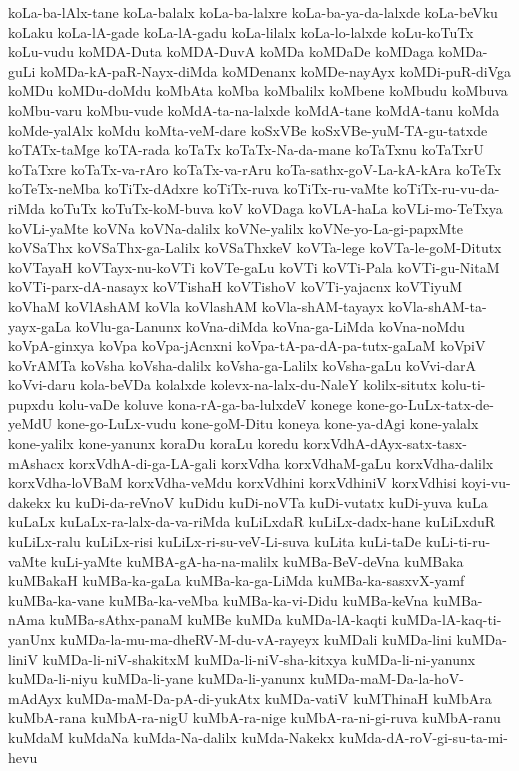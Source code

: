 {koLa-ba-lAlx-tane
koLa-balalx
koLa-ba-lalxre
koLa-ba-ya-da-lalxde
koLa-beVku
koLaku
koLa-lA-gade
koLa-lA-gadu
koLa-lilalx
koLa-lo-lalxde
koLu-koTuTx
koLu-vudu
koMDA-Duta
koMDA-DuvA
koMDa
koMDaDe
koMDaga
koMDa-guLi
koMDa-kA-paR-Nayx-diMda
koMDenanx
koMDe-nayAyx
koMDi-puR-diVga
koMDu
koMDu-doMdu
koMbAta
koMba
koMbalilx
koMbene
koMbudu
koMbuva
koMbu-varu
koMbu-vude
koMdA-ta-na-lalxde
koMdA-tane
koMdA-tanu
koMda
koMde-yalAlx
koMdu
koMta-veM-dare
koSxVBe
koSxVBe-yuM-TA-gu-tatxde
koTATx-taMge
koTA-rada
koTaTx
koTaTx-Na-da-mane
koTaTxnu
koTaTxrU
koTaTxre
koTaTx-va-rAro
koTaTx-va-rAru
koTa-sathx-goV-La-kA-kAra
koTeTx
koTeTx-neMba
koTiTx-dAdxre
koTiTx-ruva
koTiTx-ru-vaMte
koTiTx-ru-vu-da-riMda
koTuTx
koTuTx-koM-buva
koV
koVDaga
koVLA-haLa
koVLi-mo-TeTxya
koVLi-yaMte
koVNa
koVNa-dalilx
koVNe-yalilx
koVNe-yo-La-gi-papxMte
koVSaThx
koVSaThx-ga-Lalilx
koVSaThxkeV
koVTa-lege
koVTa-le-goM-Ditutx
koVTayaH
koVTayx-nu-koVTi
koVTe-gaLu
koVTi
koVTi-Pala
koVTi-gu-NitaM
koVTi-parx-dA-nasayx
koVTishaH
koVTishoV
koVTi-yajacnx
koVTiyuM
koVhaM
koVlAshAM
koVla
koVlashAM
koVla-shAM-tayayx
koVla-shAM-ta-yayx-gaLa
koVlu-ga-Lanunx
koVna-diMda
koVna-ga-LiMda
koVna-noMdu
koVpA-ginxya
koVpa
koVpa-jAcnxni
koVpa-tA-pa-dA-pa-tutx-gaLaM
koVpiV
koVrAMTa
koVsha
koVsha-dalilx
koVsha-ga-Lalilx
koVsha-gaLu
koVvi-darA
koVvi-daru
kola-beVDa
kolalxde
kolevx-na-lalx-du-NaleY
kolilx-situtx
kolu-ti-pupxdu
kolu-vaDe
koluve
kona-rA-ga-ba-lulxdeV
konege
kone-go-LuLx-tatx-de-yeMdU
kone-go-LuLx-vudu
kone-goM-Ditu
koneya
kone-ya-dAgi
kone-yalalx
kone-yalilx
kone-yanunx
koraDu
koraLu
koredu
korxVdhA-dAyx-satx-tasx-mAshacx
korxVdhA-di-ga-LA-gali
korxVdha
korxVdhaM-gaLu
korxVdha-dalilx
korxVdha-loVBaM
korxVdha-veMdu
korxVdhini
korxVdhiniV
korxVdhisi
koyi-vu-dakekx
ku
kuDi-da-reVnoV
kuDidu
kuDi-noVTa
kuDi-vutatx
kuDi-yuva
kuLa
kuLaLx
kuLaLx-ra-lalx-da-va-riMda
kuLiLxdaR
kuLiLx-dadx-hane
kuLiLxduR
kuLiLx-ralu
kuLiLx-risi
kuLiLx-ri-su-veV-Li-suva
kuLita
kuLi-taDe
kuLi-ti-ru-vaMte
kuLi-yaMte
kuMBA-gA-ha-na-malilx
kuMBa-BeV-deVna
kuMBaka
kuMBakaH
kuMBa-ka-gaLa
kuMBa-ka-ga-LiMda
kuMBa-ka-sasxvX-yamf
kuMBa-ka-vane
kuMBa-ka-veMba
kuMBa-ka-vi-Didu
kuMBa-keVna
kuMBa-nAma
kuMBa-sAthx-panaM
kuMBe
kuMDa
kuMDa-lA-kaqti
kuMDa-lA-kaq-ti-yanUnx
kuMDa-la-mu-ma-dheRV-M-du-vA-rayeyx
kuMDali
kuMDa-lini
kuMDa-liniV
kuMDa-li-niV-shakitxM
kuMDa-li-niV-sha-kitxya
kuMDa-li-ni-yanunx
kuMDa-li-niyu
kuMDa-li-yane
kuMDa-li-yanunx
kuMDa-maM-Da-la-hoV-mAdAyx
kuMDa-maM-Da-pA-di-yukAtx
kuMDa-vatiV
kuMThinaH
kuMbAra
kuMbA-rana
kuMbA-ra-nigU
kuMbA-ra-nige
kuMbA-ra-ni-gi-ruva
kuMbA-ranu
kuMdaM
kuMdaNa
kuMda-Na-dalilx
kuMda-Nakekx
kuMda-dA-roV-gi-su-ta-mi-hevu
}
